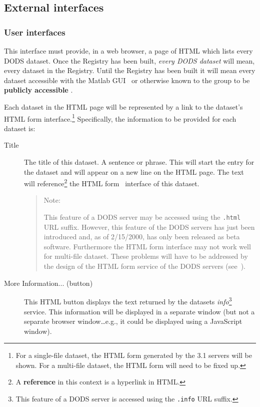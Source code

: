 \documentclass{article}
\begin{document}
\subsection{External interfaces}
\subsubsection{User interfaces}

This interface must provide, in a web browser, a page of HTML which lists
every DODS dataset. Once the Registry has been built, \emph{every DODS
  dataset} will mean, every dataset in the Registry. Until the Registry has
been built it will mean every dataset accessible with the Matlab
GUI~\cite{sgouros:MLGUI} or otherwise known to the group to be
\textbf{publicly accessible} .

Each dataset in the HTML page will be represented by a link to the dataset's
HTML form interface.\footnote{For a single-file dataset, the HTML form
  generated by the 3.1 servers will be shown. For a multi-file dataset, the
  HTML form will need to be fixed up.} Specifically, the information to be
provided for each dataset is:
  \begin{description}
  \item [Title] The title of this dataset. A sentence or phrase. This will
    start the entry for the dataset and will appear on a new line on the HTML
    page. The text will reference\footnote{A \textbf{reference} in this
      context is a hyperlink in HTML.} the HTML
    form~\cite{gallagher:HTMLform} interface of this dataset.

    \begin{quote}
      Note: 

      This feature of a DODS server may be accessed using the \texttt{.html}
      URL suffix. However, this feature of the DODS servers has just been
      introduced and, as of 2/15/2000, has only been released as beta
      software. Furthermore the HTML form interface may not work well for
      multi-file dataset. These problems will have to be addressed by the
      design of the HTML form service of the DODS servers
      (see~\cite{gallagher:HTMLform}). 
    \end{quote}

  \item [More Information... (button)] This HTML button displays the text
    returned by the datasets \emph{info}\footnote{This feature of a DODS
      server is accessed using the \texttt{.info} URL suffix.} service. This
    information will be displayed in a separate window (but not a separate
    browser window\ldots e.g., it could be displayed using a JavaScript
    window). 
  \end{description}
\end{document}
